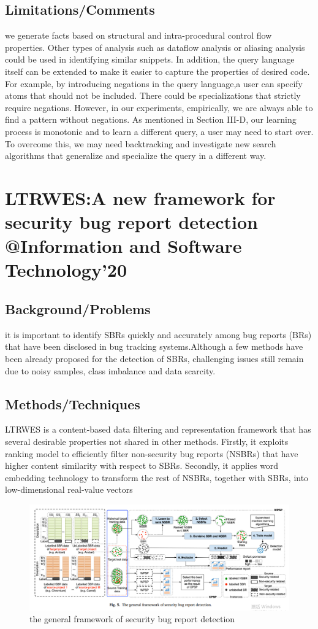 \subsection{Limitations/Comments}
we generate facts based on structural and intra-procedural control flow properties. Other types of analysis such as dataflow analysis or aliasing analysis could be used in identifying similar snippets. In addition, the query language itself can be extended to make it easier to capture the properties of desired code. For example, by introducing negations in the query language,a user can specify atoms that should not be included. There could be specializations that strictly require negations. However, in our experiments, empirically, we are always able to find a pattern without negations. As mentioned in Section III-D, our learning process is monotonic and to learn a different query, a user may need to start over. To overcome this, we may need backtracking and investigate new search algorithms that generalize and specialize the query in a different way.
\newpage

\section{LTRWES:A new framework for security bug report detection @Information and Software Technology'20}
\subsection{Background/Problems}
it is important to identify SBRs quickly and accurately among bug reports (BRs) that have been disclosed in bug tracking systems.Although a few methods have been already proposed for the detection of SBRs, challenging issues still remain due to noisy samples, class imbalance and data scarcity.
\subsection{Methods/Techniques}
LTRWES is a content-based data filtering and representation framework that has several desirable properties not shared in other methods. 
Firstly, it exploits ranking model to efficiently filter non-security bug reports (NSBRs) that have higher content similarity with respect to SBRs. 			
Secondly, it applies word embedding technology to transform the rest of NSBRs, together with SBRs, into low-dimensional real-value vectors
\begin{figure}[h]
    \centering
    \includegraphics[width=.9\linewidth]{security_bug_report_detection.png} %
    \caption{the general framework of security bug report detection}	
    \label{fig:security_bug_report_detection}
\end{figure}
